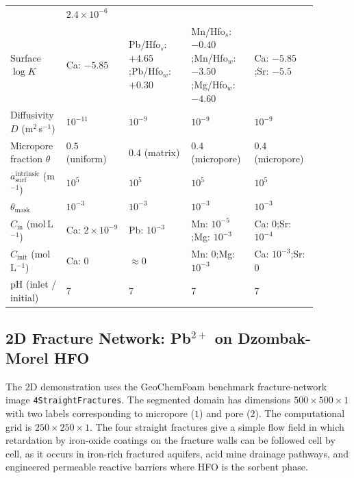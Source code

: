 \begin{table}[htbp]
\begin{tabular}{@{}p{0.13\linewidth}p{0.19\linewidth}p{0.19\linewidth}p{0.19\linewidth}p{0.19\linewidth}@{}}
            & $2.4\times10^{-6}$ \\
        Surface $\log K$
            & Ca: $-5.85$
            & Pb/Hfo$_s$: $+4.65$;\enspace Pb/Hfo$_w$: $+0.30$
            & Mn/Hfo$_s$: $-0.40$;\enspace Mn/Hfo$_w$: $-3.50$;\enspace Mg/Hfo$_w$: $-4.60$
            & Ca: $-5.85$;\enspace Sr: $-5.5$ \\
        Diffusivity $D$ (m$^2$\,s$^{-1}$)
            & $10^{-11}$
            & $10^{-9}$
            & $10^{-9}$
            & $10^{-9}$ \\
        Micropore fraction $\theta$
            & $0.5$ (uniform)
            & $0.4$ (matrix)
            & $0.4$ (micropore)
            & $0.4$ (micropore) \\
        $a_{\mathrm{surf}}^{\mathrm{intrinsic}}$ (m$^{-1}$)
            & $10^{5}$
            & $10^{5}$
            & $10^{5}$
            & $10^{5}$ \\
        $\theta_{\mathrm{mask}}$
            & $10^{-3}$
            & $10^{-3}$
            & $10^{-3}$
            & $10^{-3}$ \\
        $C_{\mathrm{in}}$ (mol\,L$^{-1}$)
            & Ca: $2\times10^{-9}$
            & Pb: $10^{-3}$
            & Mn: $10^{-5}$;\enspace Mg: $10^{-3}$
            & Ca: $0$;\enspace Sr: $10^{-4}$ \\
        $C_{\mathrm{init}}$ (mol\,L$^{-1}$)
            & Ca: $0$
            & $\approx 0$
            & Mn: $0$;\enspace Mg: $10^{-3}$
            & Ca: $10^{-3}$;\enspace Sr: $0$ \\
        pH (inlet / initial)
            & 7
            & 7
            & 7
            & 7 \\
        \bottomrule
    \end{tabular}
\end{table}

\FloatBarrier

\subsection{\texorpdfstring{2D Fracture Network: Pb$^{2+}$ on
Dzombak-Morel HFO}{2D Fracture Network: Pb2+ on Dzombak-Morel HFO}}

The 2D demonstration uses the GeoChemFoam benchmark fracture-network image
\nolinkurl{4StraightFractures}. The segmented domain has dimensions
$500 \times 500 \times 1$ with two labels corresponding to micropore ($1$) and
pore ($2$). The computational grid is $250 \times 250 \times 1$.
The four straight fractures give a simple flow field in which retardation by
iron-oxide coatings on the fracture walls can be followed cell by cell, as it
occurs in iron-rich fractured aquifers, acid mine drainage pathways, and
engineered permeable reactive barriers where HFO is the sorbent phase.

